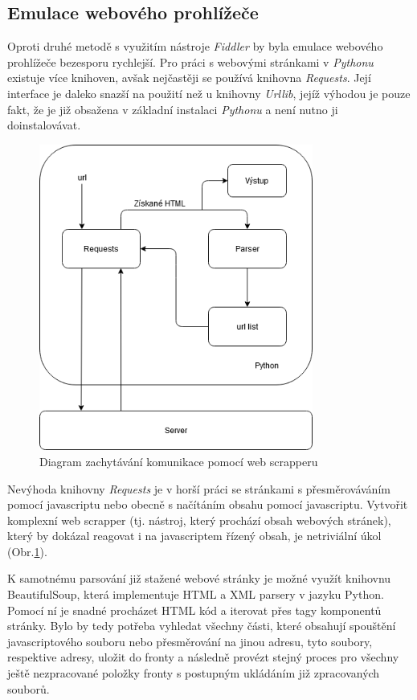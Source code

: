 \documentclass[thesis=M,czech,hidelinks]{FITthesis}[2013/05/06]
\begin{document}
\subsection{Emulace webového prohlížeče} \label{sec:parsing}
Oproti druhé metodě s využitím nástroje \textit{Fiddler} by byla emulace webového prohlížeče bezesporu rychlejší. Pro práci s webovými stránkami v \textit{Pythonu} existuje více knihoven, avšak nejčastěji se používá knihovna \textit{Requests}. Její interface je daleko snazší na použití než u knihovny \textit{Urllib}, jejíž výhodou je pouze fakt, že je již obsažena v základní instalaci \textit{Pythonu} a není nutno ji doinstalovávat. 
\begin{figure}[h]
	\centering
	\includegraphics[width=9cm]{pictures/scrapper.png}
	\caption{Diagram zachytávání komunikace pomocí web scrapperu}
	\label{fig:web_scrapper}
\end{figure}
Nevýhoda knihovny \textit{Requests} je v horší práci se stránkami s přesměrováváním pomocí javascriptu nebo obecně s načítáním obsahu pomocí javascriptu. Vytvořit komplexní web scrapper (tj. nástroj, který prochází obsah webových stránek), který by dokázal reagovat i na javascriptem řízený obsah, je netriviální úkol (Obr.\ref{fig:web_scrapper}). 

K samotnému parsování již stažené webové stránky je možné využít knihovnu BeautifulSoup\cite{beautifulsoup}, která implementuje HTML a XML parsery v jazyku Python. Pomocí ní je snadné procházet HTML kód a iterovat přes tagy komponentů stránky. Bylo by tedy potřeba vyhledat všechny části, které obsahují spouštění javascriptového souboru nebo přesměrování na jinou adresu, tyto soubory, respektive adresy, uložit do fronty a následně provézt stejný proces pro všechny ještě nezpracované položky fronty s postupným ukládáním již zpracovaných souborů. 
\end{document}
